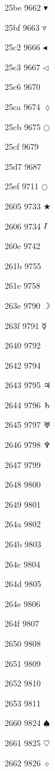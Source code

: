 \documentclass[11pt]{article}
\begin{document}
25be 9662 \ensuremath{\blacktriangledown}

25bf 9663 \ensuremath{\triangledown}

25c2 9666 \ensuremath{\blacktriangleleft}

25c3 9667 \ensuremath{\triangleleft}

25c6 9670 

25ca 9674 \ensuremath{\lozenge}

25cb 9675 \ensuremath{\bigcirc}

25cf 9679 

25d7 9687 

25ef 9711 \ensuremath{\bigcirc}

2605 9733 \ensuremath{\bigstar}

2606 9734 \ensuremath{\ding{73}}

260e 9742 

261b 9755 

261e 9758 

263e 9790 \ensuremath{\rightmoon}

263f 9791 \ensuremath{\mercury}

2640 9792 \venus

2642 9794 \male

2643 9795 \ensuremath{\jupiter}

2644 9796 \ensuremath{\saturn}

2645 9797 \ensuremath{\uranus}

2646 9798 \ensuremath{\neptune}

2647 9799 \pluto

2648 9800 \aries

2649 9801 \taurus

264a 9802 \gemini

264b 9803 \cancer

264c 9804 \leo

264d 9805 \virgo

264e 9806 \libra

264f 9807 \scorpio

2650 9808 \sagittarius

2651 9809 \capricornus

2652 9810 \aquarius

2653 9811 \pisces

2660 9824 \ensuremath{\spadesuit}

2661 9825 \ensuremath{\heartsuit}

2662 9826 \ensuremath{\diamond}
\end{document}
